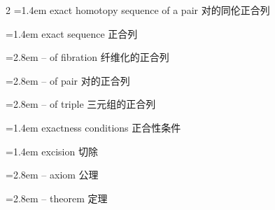 \begin{multicols}{2}
\noindent\hangindent=1.4em exact homotopy sequence of a pair \quad 对的同伦正合列 \par
\noindent\hangindent=1.4em exact sequence \quad 正合列 \quad\par
\noindent\hangindent=2.8em -- of fibration \quad 纤维化的正合列 \par
\noindent\hangindent=2.8em -- of pair \quad 对的正合列 \par
\noindent\hangindent=2.8em -- of triple \quad 三元组的正合列 \par
\noindent\hangindent=1.4em exactness conditions \quad 正合性条件 \par
\noindent\hangindent=1.4em excision \quad 切除 \quad\par
\noindent\hangindent=2.8em -- axiom \quad 公理 \par
\noindent\hangindent=2.8em -- theorem \quad 定理 \par
\end{multicols}


